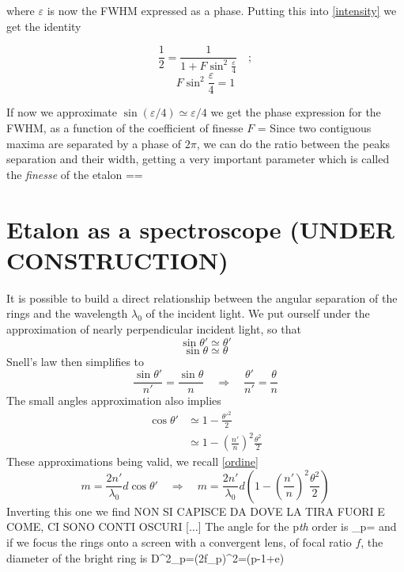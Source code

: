 where $\varepsilon$ is now the FWHM expressed as a phase. Putting this into \cref{intensity} we get the identity

$$\frac{1}{2}=\frac{1}{1+F\sin^2\frac{\varepsilon}{4}}\quad;$$ $$F\sin^2\frac{\varepsilon}{4}=1$$

If now we approximate $\sin\left(\varepsilon/4\right)\simeq\varepsilon/4$ we get the phase expression for the FWHM, as a function of the coefficient of finesse $F$
\mate
\varepsilon=
\atem
Since two contiguous maxima are separated by a phase of $2\pi$, we can do the ratio between the peaks separation and their width, getting a very important parameter which is called the \textit{finesse} of the etalon
\mate
{}\equiv\frac{2\pi}{\varepsilon}==
\label{finesse}
\atem
	\section{Etalon as a spectroscope (UNDER CONSTRUCTION)}\label{etalonspec}
It is possible to build a direct relationship between the angular separation of the rings and the wavelength $\lambda_0$ of the incident light.
We put ourself under the approximation of nearly perpendicular incident light, so that
$$\sin\theta'\simeq\theta'$$$$\sin\theta\simeq\theta$$
Snell's law then simplifies to
$$\frac{\sin\theta'}{n'}=\frac{\sin\theta}{n}\quad\Rightarrow\quad\frac{\theta'}{n'}=\frac{\theta}{n}$$
The small angles approximation also implies
\begin{align} 
\cos\theta'&\simeq1-\frac{\theta'^2}{2}\nonumber\\
&\simeq1-\left(\frac{n'}{n}\right)^2\frac{\theta^2}{2}\nonumber
\end{align}
These approximations being valid, we recall \cref{ordine}
$$m=\frac{2n'}{\lambda_0}d\cos\theta'\quad\Rightarrow\quad m=\frac{2n'}{\lambda_0}d\left(1-\left(\frac{n'}{n}\right)^2\frac{\theta^2}{2}\right)$$
Inverting this one we find
NON SI CAPISCE DA DOVE LA TIRA FUORI E COME, CI SONO CONTI OSCURI [$\dots$]
The angle for the p\textit{th} order is
\mate
\theta_p=
\atem
and if we focus the rings onto a screen with a convergent lens, of focal ratio $f$, the diameter of the bright ring is
\mate
D^2_p=(2f\theta_p)^2=(p-1+e)
\atem